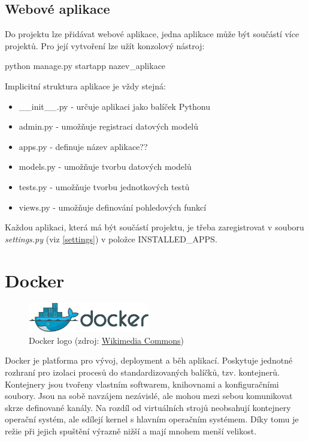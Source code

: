 \subsection{Webové aplikace}
\label{django-app}
Do projektu lze přidávat webové aplikace, jedna aplikace může být
součástí více projektů. Pro její vytvoření lze užít konzolový nástroj:

\begin{center}
\textsf{python manage.py startapp nazev\_aplikace}
\end{center}

Implicitní struktura aplikace je vždy stejná:

\begin{itemize}
\item \textsf{\_\_init\_\_.py} - určuje aplikaci jako balíček Pythonu
\item \textsf{admin.py} - umožňuje registraci datových modelů
\item \textsf{apps.py} - definuje název aplikace??
\item \textsf{models.py} - umožňuje tvorbu datových modelů
\item \textsf{tests.py} - umožňuje tvorbu jednotkových testů
\item \textsf{views.py} - umožňuje definování pohledových funkcí
\end{itemize}

Každou aplikaci, která má být součástí projektu, je třeba
zaregistrovat v souboru \textit{settings.py} (viz \ref{settings}) v
položce \textsf{INSTALLED\_APPS}.

\section{Docker}
\label{docker}

\begin{figure}[H] \centering
      \includegraphics[width=150pt]{./pictures/Docker_(container_engine)_logo.png}
      \caption[Docker logo]{Docker logo (zdroj:
\href{https://commons.wikimedia.org/wiki/File:Docker_(container_engine)_logo.png}{Wikimedia Commons})}
      \label{fig:docker}
  \end{figure}
  
Docker je platforma pro vývoj, deployment a běh aplikací. Poskytuje
jednotné rozhraní pro izolaci procesů do standardizovaných balíčků,
tzv. kontejnerů. Kontej\-nery jsou tvořeny vlastním softwarem,
knihovnami a konfiguračními soubory. Jsou na sobě navzájem nezávislé,
ale mohou mezi sebou komunikovat skrze definované kanály. Na rozdíl od
virtuálních strojů neobsahují kontejnery operační systém, ale sdílejí
kernel s hlavním operačním systémem. Díky tomu je režie při jejich
spuštění výrazně nižší a mají mnohem menší velikost.

